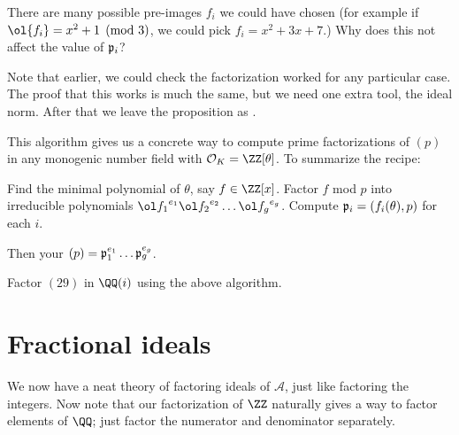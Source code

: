 \begin{ques}
	There are many possible pre-images $f_i$ we could have chosen
	(for example if $\ol{f_i} = x^2+1 \pmod 3$, we could pick $f_i = x^2 + 3x + 7$.)
	Why does this not affect the value of $\mathfrak p_i$?
\end{ques}

Note that earlier, we could check the factorization worked
for any particular case. 
The proof that this works is much the same, but we need one extra tool, the ideal norm.
After that we leave the proposition as .

This algorithm gives us a concrete way to compute prime factorizations of $(p)$
in any monogenic number field with $\OO_K = \ZZ[\theta]$. To summarize the recipe:
\begin{enumerate}
	\ii Find the minimal polynomial of $\theta$, say $f \in \ZZ[x]$.
	\ii Factor $f$ mod $p$ into irreducible polynomials ${\ol f_1}^{e_1} {\ol f_2}^{e_2} \dots {\ol f_g}^{e_g}$.
	\ii Compute $\mathfrak p_i = (f_i(\theta), p)$ for each $i$.
\end{enumerate}
Then your $(p) = \mathfrak p_1^{e_1} \dots \mathfrak p_g^{e_g}$.

\begin{exercise}
	Factor $(29)$ in $\QQ(i)$ using the above algorithm.
\end{exercise}


\section{Fractional ideals}
We now have a neat theory of factoring ideals of $\mathcal A$,
just like factoring the integers.
Now note that our factorization of $\ZZ$ naturally gives a way to factor
elements of $\QQ$; just factor the numerator and denominator separately.

